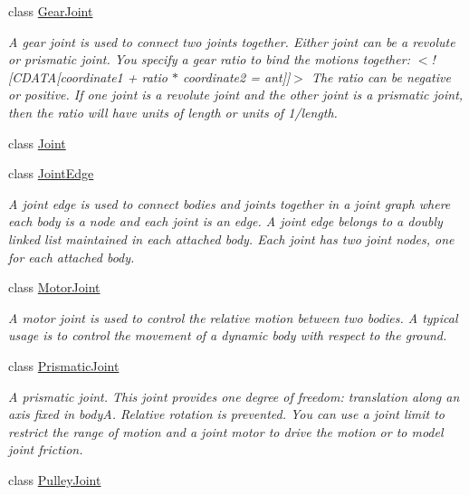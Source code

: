 \begin{DoxyCompactItemize}
class \hyperlink{class_farseer_physics_1_1_dynamics_1_1_joints_1_1_gear_joint}{Gear\+Joint}
\begin{DoxyCompactList}\small\item\em A gear joint is used to connect two joints together. Either joint can be a revolute or prismatic joint. You specify a gear ratio to bind the motions together\+: $<$!\mbox{[}C\+D\+A\+T\+A\mbox{[}coordinate1 + ratio $\ast$ coordinate2 = ant\mbox{]}\mbox{]}$>$ The ratio can be negative or positive. If one joint is a revolute joint and the other joint is a prismatic joint, then the ratio will have units of length or units of 1/length. \end{DoxyCompactList}\item 
class \hyperlink{class_farseer_physics_1_1_dynamics_1_1_joints_1_1_joint}{Joint}
\item 
class \hyperlink{class_farseer_physics_1_1_dynamics_1_1_joints_1_1_joint_edge}{Joint\+Edge}
\begin{DoxyCompactList}\small\item\em A joint edge is used to connect bodies and joints together in a joint graph where each body is a node and each joint is an edge. A joint edge belongs to a doubly linked list maintained in each attached body. Each joint has two joint nodes, one for each attached body. \end{DoxyCompactList}\item 
class \hyperlink{class_farseer_physics_1_1_dynamics_1_1_joints_1_1_motor_joint}{Motor\+Joint}
\begin{DoxyCompactList}\small\item\em A motor joint is used to control the relative motion between two bodies. A typical usage is to control the movement of a dynamic body with respect to the ground. \end{DoxyCompactList}\item 
class \hyperlink{class_farseer_physics_1_1_dynamics_1_1_joints_1_1_prismatic_joint}{Prismatic\+Joint}
\begin{DoxyCompactList}\small\item\em A prismatic joint. This joint provides one degree of freedom\+: translation along an axis fixed in body\+A. Relative rotation is prevented. You can use a joint limit to restrict the range of motion and a joint motor to drive the motion or to model joint friction. \end{DoxyCompactList}\item 
class \hyperlink{class_farseer_physics_1_1_dynamics_1_1_joints_1_1_pulley_joint}{Pulley\+Joint}

\end{DoxyCompactItemize}

